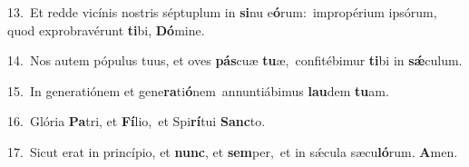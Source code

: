 {\numbfont\textcolor{\numbcolor}{13.}}~Et redde vicínis nostris séptuplum in \textbf{si}\-nu e\-\textbf{ó}\-rum:~\star impropérium ipsórum, quod exprobravérunt \textbf{ti}\-bi, \textbf{Dó}\-mine.\par
{\numbfont\textcolor{\numbcolor}{14.}}~Nos autem pópulus tuus, et oves \textbf{pás}\-cuæ \textbf{tu}\-æ,~\star confitébimur \textbf{ti}\-bi in \textbf{sǽ}\-culum.\par
{\numbfont\textcolor{\numbcolor}{15.}}~In generatiónem et gene\-\textbf{ra}\-ti\-\textbf{ó}\-nem~\star annuntiábimus \textbf{lau}\-dem \textbf{tu}\-am.\par
{\numbfont\textcolor{\numbcolor}{16.}}~Glória \textbf{Pa}\-tri, et \textbf{Fí}\-lio,~\star et Spi\-\textbf{rí}\-tui \textbf{Sanc}\-to.\par
{\numbfont\textcolor{\numbcolor}{17.}}~Sicut erat in princípio, et \textbf{nunc}\-, et \textbf{sem}\-per,~\star et in sǽcula sæcu\-\textbf{ló}\-rum. \textbf{A}\-men.\par
